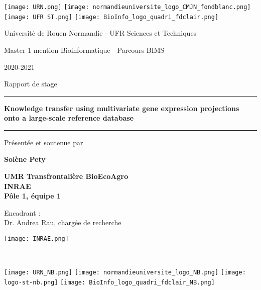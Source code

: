 \documentclass[twoside]{article}
\begin{document}
\thispagestyle{empty}

\texttt{[image: URN.png]}
\hfill
\texttt{[image: normandieuniversite\_logo\_CMJN\_fondblanc.png]}
\hfill
\texttt{[image: UFR ST.png]}
\hfill
\hspace{3.5cm}
\texttt{[image: BioInfo\_logo\_quadri\_fdclair.png]}

\begin{center}
   \large Université de Rouen Normandie - UFR Sciences et Techniques
   
   \vspace{0.2cm}
   \large Master 1 mention Bioinformatique - Parcours BIMS
   
   \vspace{0.2cm}
   \large 2020-2021
   
   \vspace{2cm}
   \large Rapport de stage
   
   \vspace{1cm}
   \hrule
   \vspace{0.2cm}
        \Huge \textbf{Knowledge transfer using multivariate gene expression projections onto a large-scale reference database}
   \vspace{0.2cm}
   \hrule
   
   \vspace{1cm}
   \large Présentée et soutenue par
   
   \vspace{0.5cm}
   \huge \textbf{Solène Pety}
   
   \vspace{2.5cm}
   \large \textbf{UMR Transfrontalière BioEcoAgro\\INRAE\\Pôle 1, équipe 1}
   
   \vspace{1cm}
   \Large Encadrant :\\Dr. Andrea Rau, chargée de recherche
   
   \vspace{1cm}
\end{center}

\vfill %
\begin{center}
\texttt{[image: INRAE.png]}
\end{center}

\newpage
\thispagestyle{empty}
~

\newpage
\thispagestyle{empty}
\texttt{[image: URN\_NB.png]}
\hfill
\texttt{[image: normandieuniversite\_logo\_NB.png]}
\hfill
\texttt{[image: logo-st-nb.png]}
\hfill
\hspace{3.5cm}
\texttt{[image: BioInfo\_logo\_quadri\_fdclair\_NB.png]}
\end{document}
